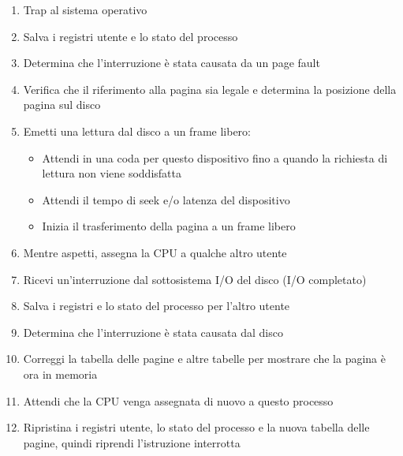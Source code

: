 \begin{enumerate}
  \setlength{\itemsep}{0pt}
  \item Trap al sistema operativo
  \item Salva i registri utente e lo stato del processo
  \item Determina che l'interruzione è stata causata da un page fault
  \item Verifica che il riferimento alla pagina sia legale e determina la posizione della pagina sul disco
  \item Emetti una lettura dal disco a un frame libero:
        \begin{itemize}
          \setlength{\itemsep}{0pt}
          \item Attendi in una coda per questo dispositivo fino a quando la richiesta di lettura non viene soddisfatta
          \item Attendi il tempo di seek e/o latenza del dispositivo
          \item Inizia il trasferimento della pagina a un frame libero
        \end{itemize}
  \item Mentre aspetti, assegna la CPU a qualche altro utente
  \item Ricevi un'interruzione dal sottosistema I/O del disco (I/O completato)
  \item Salva i registri e lo stato del processo per l'altro utente
  \item Determina che l'interruzione è stata causata dal disco
  \item Correggi la tabella delle pagine e altre tabelle per mostrare che la pagina è ora in memoria
  \item Attendi che la CPU venga assegnata di nuovo a questo processo
  \item Ripristina i registri utente, lo stato del processo e la nuova tabella delle pagine, quindi riprendi l'istruzione interrotta
\end{enumerate}





